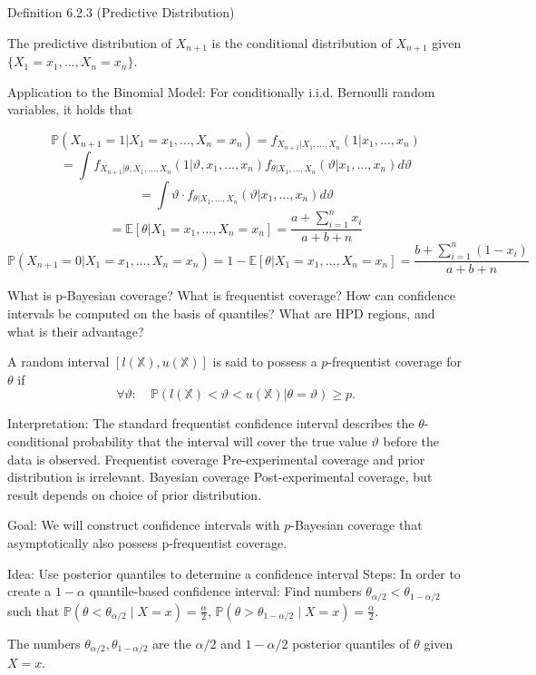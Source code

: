 Definition 6.2.3 (Predictive Distribution) 

The predictive distribution of \(X_{n+1}\) is the conditional distribution of \(X_{n+1}\) given \(\{X_1 = x_1, \ldots, X_n = x_n\}\).

Application to the Binomial Model:
For conditionally i.i.d. Bernoulli random variables, it holds that

\[
\mathbb{P}(X_{n+1} = 1 | X_1 = x_1, \ldots, X_n = x_n) = f_{X_{n+1} | X_1, \ldots, X_n}(1 | x_1, \ldots, x_n)
\]
\[
= \int f_{X_{n+1}| \theta, X_1, \ldots, X_n}(1 | \vartheta, x_1, \ldots, x_n) f_{\theta | X_1, \ldots, X_n}(\vartheta | x_1, \ldots, x_n) d\vartheta
\]
\[
= \int \vartheta \cdot f_{\theta | X_1, \ldots, X_n}(\vartheta | x_1, \ldots, x_n) d\vartheta
\]
\[
= \mathbb{E}[\theta | X_1 = x_1, \ldots, X_n = x_n] = \frac{a + \sum_{i=1}^{n} x_i}{a + b + n}
\]
\[
\mathbb{P}(X_{n+1} = 0 | X_1 = x_1, \ldots, X_n = x_n) = 1 - \mathbb{E}[\theta | X_1 = x_1, \ldots, X_n = x_n] = \frac{b + \sum_{i=1}^{n} (1 - x_i)}{a + b + n}
\]

What is p-Bayesian coverage? What is frequentist coverage? How can confidence
intervals be computed on the basis of quantiles? What are HPD regions, and what
is their advantage?

A random interval \( \left[ l(\mathbb{X}), u(\mathbb{X}) \right] \)  is said to possess a \( p \)-frequentist coverage for \( \theta \) if
\[
\forall \vartheta : \quad \mathbb{P}(l(\mathbb{X}) < \vartheta < u(\mathbb{X}) | \theta = \vartheta) \geq p.
\]

Interpretation: The standard frequentist confidence interval describes the \(\theta\)-conditional probability that the interval 
will cover the true value \( \vartheta \) before the data is observed.
Frequentist coverage Pre-experimental coverage and prior distribution is irrelevant.
Bayesian coverage Post-experimental coverage, but result depends on choice of prior distribution.

Goal: We will construct confidence intervals with \( p \)-Bayesian coverage that asymptotically also possess p-frequentist coverage.

Idea: Use posterior quantiles to determine a confidence interval
Steps: In order to create a \(1 - \alpha\) quantile-based confidence interval:
Find numbers \(\theta_{\alpha/2} < \theta_{1-\alpha/2}\) such that
\(\mathbb{P}(\theta < \theta_{\alpha/2} \mid X = x) = \frac{\alpha}{2}\),
\(\mathbb{P}(\theta > \theta_{1-\alpha/2} \mid X = x) = \frac{\alpha}{2}\).

The numbers \(\theta_{\alpha/2}, \theta_{1-\alpha/2}\) are the \(\alpha/2\) and \(1-\alpha/2\) posterior quantiles of \(\theta\) given \(X = x\).

